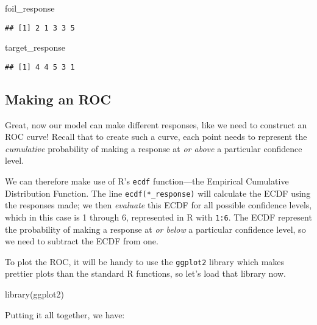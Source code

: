 \documentclass[
]{book}
\newenvironment{Shaded}{\begin{snugshade}}{\end{snugshade}}
\newcommand{\FunctionTok}[1]{\textcolor[rgb]{0.00,0.00,0.00}{#1}}
\newcommand{\NormalTok}[1]{#1}
\begin{document}
\begin{Shaded}
\begin{Highlighting}[]
\NormalTok{foil\_response}
\end{Highlighting}
\end{Shaded}

\begin{verbatim}
## [1] 2 1 3 3 5
\end{verbatim}

\begin{Shaded}
\begin{Highlighting}[]
\NormalTok{target\_response}
\end{Highlighting}
\end{Shaded}

\begin{verbatim}
## [1] 4 4 5 3 1
\end{verbatim}

\hypertarget{making-an-roc}{%
\subsection{Making an ROC}\label{making-an-roc}}

Great, now our model can make different responses, like we need to construct an ROC curve! Recall that to create such a curve, each point needs to represent the \emph{cumulative} probability of making a response at \emph{or above} a particular confidence level.

We can therefore make use of R's \texttt{ecdf} function---the Empirical Cumulative Distribution Function. The line \texttt{ecdf(*\_response)} will calculate the ECDF using the responses made; we then \emph{evaluate} this ECDF for all possible confidence levels, which in this case is 1 through 6, represented in R with \texttt{1:6}. The ECDF represent the probability of making a response at \emph{or below} a particular confidence level, so we need to subtract the ECDF from one.

To plot the ROC, it will be handy to use the \texttt{ggplot2} library which makes prettier plots than the standard R functions, so let's load that library now.

\begin{Shaded}
\begin{Highlighting}[]
\FunctionTok{library}\NormalTok{(ggplot2)}
\end{Highlighting}
\end{Shaded}

Putting it all together, we have:
\end{document}

